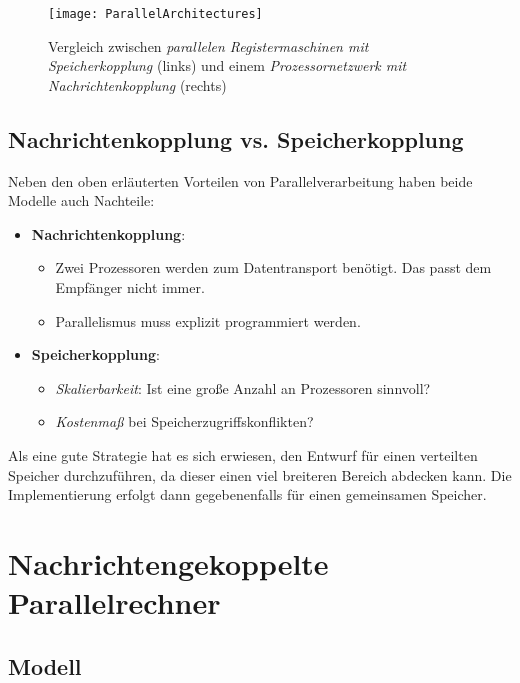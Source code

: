 \begin{figure}[H]
  \texttt{[image: ParallelArchitectures]}
  \captionsetup{width=.8\textwidth}
  \caption{Vergleich zwischen \emph{parallelen Registermaschinen mit Speicherkopplung} (links) und einem \emph{Prozessornetzwerk mit Nachrichtenkopplung} (rechts)}
\end{figure}

\subsection{Nachrichtenkopplung vs. Speicherkopplung}

Neben den oben erläuterten Vorteilen von Parallelverarbeitung haben beide Modelle auch Nachteile:

\begin{itemize}
  \item \textbf{Nachrichtenkopplung}:
  \begin{itemize}
    \item Zwei Prozessoren werden zum Datentransport benötigt. Das passt dem Empfänger nicht immer.
    \item Parallelismus muss explizit programmiert werden.
  \end{itemize}
  \item \textbf{Speicherkopplung}:
  \begin{itemize}
    \item \emph{Skalierbarkeit}: Ist eine große Anzahl an Prozessoren sinnvoll?
    \item \emph{Kostenmaß} bei Speicherzugriffskonflikten?
  \end{itemize}
\end{itemize}

Als eine gute Strategie hat es sich erwiesen, den Entwurf für einen verteilten Speicher durchzuführen, da dieser einen viel breiteren Bereich abdecken kann. Die Implementierung erfolgt dann gegebenenfalls für einen gemeinsamen Speicher.

\section{Nachrichtengekoppelte Parallelrechner}

\subsection{Modell}

